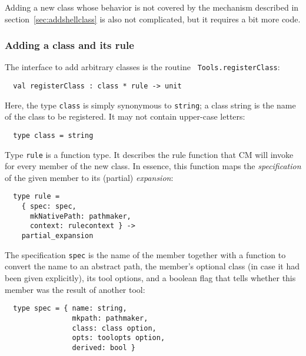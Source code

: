 Adding a new class whose behavior is not covered by the mechanism
described in section~\ref{sec:addshellclass} is also not complicated,
but it requires a bit more code.

\subsubsection{Adding a class and its rule}

The interface to add arbitrary classes is the routine {\tt
Tools.registerClass}:

\begin{verbatim}
  val registerClass : class * rule -> unit
\end{verbatim}

Here, the type {\tt class} is simply synonymous to {\tt string}; a
class string is the name of the class to be registered.  It may not
contain upper-case letters:

\begin{verbatim}
  type class = string
\end{verbatim}

Type {\tt rule} is a function type.  It describes the rule function
that CM will invoke for every member of the new class.  In essence,
this function maps the {\em specification} of the given member to its
(partial) {\em expansion}:

\begin{verbatim}
  type rule =
    { spec: spec,
      mkNativePath: pathmaker,
      context: rulecontext } ->
    partial_expansion
\end{verbatim}

The specification {\tt spec} is the name of the member together with a
function to convert the name to an abstract path, the member's
optional class (in case it had been given explicitly), its tool
options, and a boolean flag that tells whether this member was the
result of another tool:

\begin{verbatim}
  type spec = { name: string,
                mkpath: pathmaker,
                class: class option,
                opts: toolopts option,
                derived: bool }
\end{verbatim}

